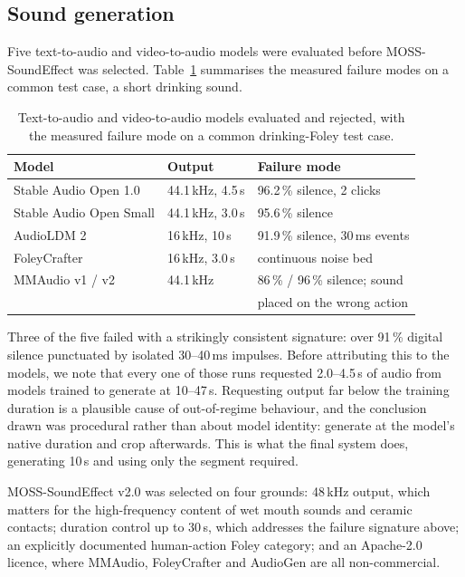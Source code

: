 \documentclass[conference]{IEEEtran}
\begin{document}
\subsection{Sound generation}

Five text-to-audio and video-to-audio models were evaluated before
MOSS-SoundEffect was selected. Table~\ref{tab:rejected} summarises the measured
failure modes on a common test case, a short drinking sound.

\begin{table}[t]
\caption{Text-to-audio and video-to-audio models evaluated and rejected,
with the measured failure mode on a common drinking-Foley test case.}
\label{tab:rejected}
\centering
\small
\begin{tabular}{@{}lll@{}}
\toprule
\textbf{Model} & \textbf{Output} & \textbf{Failure mode} \\
\midrule
Stable Audio Open 1.0 & 44.1\,kHz, 4.5\,s & 96.2\,\% silence, 2 clicks \\
Stable Audio Open Small & 44.1\,kHz, 3.0\,s & 95.6\,\% silence \\
AudioLDM 2 & 16\,kHz, 10\,s & 91.9\,\% silence, 30\,ms events \\
FoleyCrafter & 16\,kHz, 3.0\,s & continuous noise bed \\
MMAudio v1 / v2 & 44.1\,kHz & 86\,\% / 96\,\% silence; sound \\
 & & placed on the wrong action \\
\bottomrule
\end{tabular}
\end{table}

Three of the five failed with a strikingly consistent signature: over 91\,\%
digital silence punctuated by isolated 30--40\,ms impulses. Before attributing
this to the models, we note that every one of those runs requested 2.0--4.5\,s of
audio from models trained to generate at 10--47\,s. Requesting output far below
the training duration is a plausible cause of out-of-regime behaviour, and the
conclusion drawn was procedural rather than about model identity: generate at the
model's native duration and crop afterwards. This is what the final system does,
generating 10\,s and using only the segment required.

MOSS-SoundEffect v2.0 was selected on four grounds: 48\,kHz output, which matters
for the high-frequency content of wet mouth sounds and ceramic contacts;
duration control up to 30\,s, which addresses the failure signature above; an
explicitly documented human-action Foley category; and an Apache-2.0 licence,
where MMAudio, FoleyCrafter and AudioGen are all non-commercial.
\end{document}
